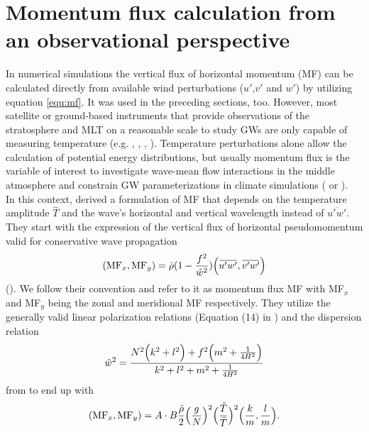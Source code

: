 \section{Momentum flux calculation from an observational perspective}
\label{sec:res3D-sim-vs-obs}
In numerical simulations the vertical flux of horizontal momentum (MF) can be calculated directly from available wind perturbations ($u'$,$v'$ and $w'$) by utilizing equation \ref{equ:mf}. It was used in the preceding sections, too. However, most satellite or ground-based instruments that provide observations of the stratosphere and MLT on a reasonable scale to study GWs are only capable of measuring temperature (e.g. \cite{wu_satellite_1996}, \cite[]{ern_absolute_2004}, \cite{hindley_gravity_2019}, \cite{kaifler_compact_2021}). Temperature perturbations alone allow the calculation of potential energy distributions, but usually momentum flux is the variable of interest to investigate wave-mean flow interactions in the middle atmosphere and constrain GW parameterizations in climate simulations (\cite[]{geller_comparison_2013} or \cite[]{kim_overview_2003}). \\
In this context, \textcite[]{ern_absolute_2004} derived a formulation of MF that depends on the temperature amplitude $\hat{T}$ and the wave's horizontal and vertical wavelength instead of $\overbar{u'w'}$. They start with the expression of the vertical flux of horizontal pseudomomentum valid for conservative wave propagation
\begin{equation}
    (\mathrm{MF}_x, \mathrm{MF}_y) = \bar{\rho} (1-\frac{f^2}{\hat{w}^2}) \Bigl(\overbar{u'w'},\overbar{v'w'}\Bigr) 
    \label{equ:ps-mf}
\end{equation}
(\cite[]{fritts_gravity_2003}). We follow their convention and refer to it as momentum flux MF with MF$_x$ and MF$_y$ being the zonal and meridional MF respectively. They utilize the generally valid linear polarization relations (Equation (14) in \textcite[]{fritts_gravity_2003}) and the dispersion relation
\begin{equation}
    \hat{w}^2 = \frac{N^2 \Bigl(k^2+l^2\Bigr) + f^2 \Bigl(m^2 + \frac{1}{4H^2}\Bigr)}{k^2+l^2+m^2+\frac{1}{4H^2}}
    \label{equ_lid:dispersion_noAss}
\end{equation}
from \textcite[]{fritts_gravity_2003} to end up with
\begin{equation}
    (\mathrm{MF}_x, \mathrm{MF}_y) = A \cdot B \frac{\bar{\rho}}{2} \Bigl(\frac{g}{N}\Bigr)^2 {\Bigl(\frac{\hat{T}}{\bar{T}}\Bigr)^2} \Bigl(\frac{k}{m},\frac{l}{m}\Bigr).
    \label{equ:mf-tp}
\end{equation}
